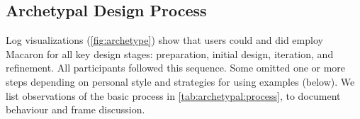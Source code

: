 \subsection{Archetypal Design Process}
Log visualizations (\autoref{fig:archetype}) show that users could and did employ Macaron for all key design stages: preparation, initial design, iteration, and refinement. %
All participants followed this sequence.
Some omitted one or more steps depending on personal style and strategies for using examples (below). %
We list observations of the basic process in \autoref{tab:archetypal:process}, to document behaviour and frame discussion.






    
